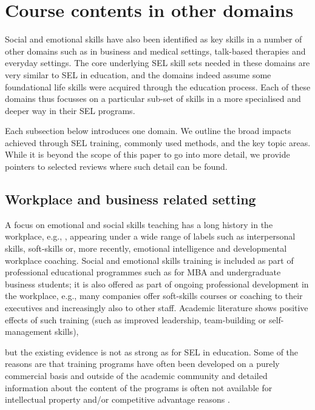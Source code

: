 \documentclass[prodmode,acmtochi]{acmsmall}
\newcommand{\GeraldineFIX}[1]{}
\begin{document}


\iffalse
\section{Course contents in other domains}
\label{sec:linkDomains}
Social
and emotional skills have also been identified as key skills in a number of other domains such as in business and medical settings, talk-based therapies and everyday settings. The core underlying SEL skill sets needed in these domains are very similar to SEL in education, and the domains indeed assume some foundational life skills were acquired through the education process. Each of these domains thus focusses on a particular sub-set of skills in a more specialised and deeper way in their SEL programs. %

Each subsection below introduces one domain. We outline the broad impacts achieved through SEL training, commonly used methods, and the key topic areas. While it is beyond the scope of this paper to go into more detail, we provide pointers to selected reviews where such detail can be found.
 
  

\subsection{Workplace and business related setting}

A focus on emotional and social skills teaching has a long history in the workplace, e.g.,  \cite{Bailey1983,Bailey1983a}, appearing under a wide range of labels such as interpersonal skills, soft-skills or, more recently, emotional intelligence and developmental workplace coaching. Social and emotional skills training is included as part of professional educational programmes such as for MBA and undergraduate business students; it is also offered as part of ongoing professional development in the workplace, e.g., many companies offer soft-skills courses or coaching to their executives and increasingly also to other staff. 
%
Academic literature shows positive effects of such training (such as improved leadership, team-building or self-management skills),
\GeraldineFIX{G: \textbf{(G:\ SUCH\ AS???)},} 
but the existing evidence is not as strong as for SEL in education. Some of the reasons are that training programs have often been developed on a purely commercial basis and outside of the academic community  and detailed information about the content of the programs is often not available for intellectual property and/or competitive advantage reasons \cite{Walter2011,Clarke2006,Riggio2003}. 
\end{document}
